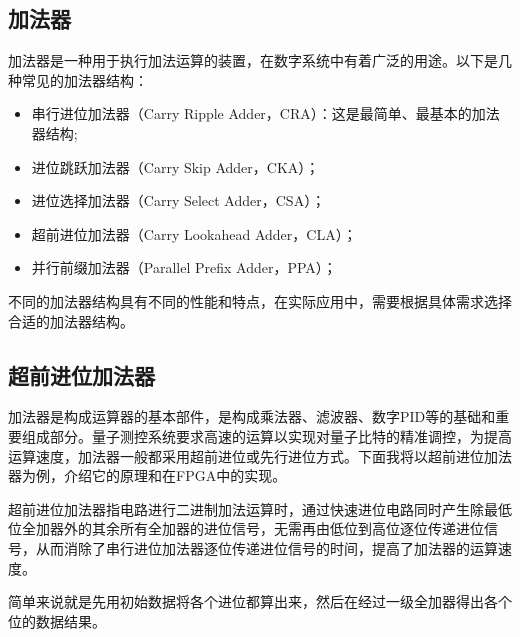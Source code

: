 \subsection[加法器]{加法器}


加法器是一种用于执行加法运算的装置，在数字系统中有着广泛的用途。以下是几种常见的加法器结构：
\begin{itemize}
    \item 串行进位加法器（Carry Ripple Adder，CRA）：这是最简单、最基本的加法器结构;
    \item 进位跳跃加法器（Carry Skip Adder，CKA）；
    \item 进位选择加法器（Carry Select Adder，CSA）；
    \item 超前进位加法器（Carry Lookahead Adder，CLA）；
    \item 并行前缀加法器（Parallel Prefix Adder，PPA）；
\end{itemize}
 
不同的加法器结构具有不同的性能和特点，在实际应用中，需要根据具体需求选择合适的加法器结构。

\subsection[超前进位加法器]{超前进位加法器\label{section:carray_lookahead_adder}}

加法器是构成运算器的基本部件，是构成乘法器、滤波器、数字PID等的基础和重要组成部分。量子测控系统要求高速的运算以实现对量子比特的精准调控，为提高运算速度，加法器一般都采用超前进位或先行进位方式。下面我将以超前进位加法器为例，介绍它的原理和在FPGA中的实现。

超前进位加法器指电路进行二进制加法运算时，通过快速进位电路同时产生除最低位全加器外的其余所有全加器的进位信号，无需再由低位到高位逐位传递进位信号，从而消除了串行进位加法器逐位传递进位信号的时间，提高了加法器的运算速度。

简单来说就是先用初始数据将各个进位都算出来，然后在经过一级全加器得出各个位的数据结果。

